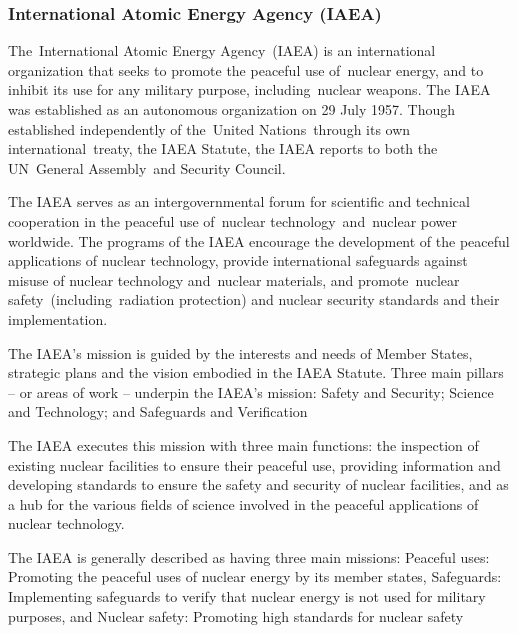 \documentclass[twocolumn,a4paper]{article}
\begin{document}
\subsubsection{International Atomic Energy Agency (IAEA)}
The International Atomic Energy Agency (IAEA) is an international organization 
that seeks to promote the peaceful use of nuclear energy, and to inhibit its use 
for any military purpose, including nuclear weapons. The IAEA was established as 
an autonomous organization on 29 July 1957. Though established independently of 
the United Nations through its own international treaty, the IAEA Statute, the 
IAEA reports to both the UN General Assembly and Security Council.

The IAEA serves as an intergovernmental forum for scientific and technical 
cooperation in the peaceful use of nuclear technology and nuclear power worldwide. 
The programs of the IAEA encourage the development of the peaceful applications of 
nuclear technology, provide international safeguards against misuse of nuclear 
technology and nuclear materials, and promote nuclear safety (including radiation 
protection) and nuclear security standards and their implementation.

The IAEA's mission is guided by the interests and needs of Member States, strategic 
plans and the vision embodied in the IAEA Statute. Three main pillars -- or areas of 
work -- underpin the IAEA's mission: Safety and Security; Science and Technology; 
and Safeguards and Verification

The IAEA executes this mission with three main functions: the inspection of existing 
nuclear facilities to ensure their peaceful use, providing information and developing 
standards to ensure the safety and security of nuclear facilities, and as a hub for 
the various fields of science involved in the peaceful applications of nuclear technology.

The IAEA is generally described as having three main missions:
Peaceful uses: Promoting the peaceful uses of nuclear energy by its member states,
Safeguards: Implementing safeguards to verify that nuclear energy is not used for military purposes, and
Nuclear safety: Promoting high standards for nuclear safety
\end{document}
